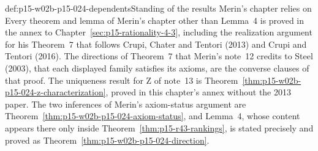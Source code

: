\begin{proofboundary}{def:p15-w02b-p15-024-dependents}{Standing of the results Merin's chapter relies on}
Every theorem and lemma of Merin's chapter other than Lemma~4 is
proved in the annex to Chapter~\ref{sec:p15-rationality-4-3}, including the realization
argument for his Theorem~7 that follows Crupi, Chater and Tentori (2013)
and Crupi and Tentori (2016). The directions of Theorem~7 that Merin's
note~12 credits to Steel (2003), that each displayed family satisfies
its axioms, are the converse clauses of that proof. The uniqueness
result for Z of note~13 is
Theorem~\ref{thm:p15-w02b-p15-024-z-characterization}, proved in this
chapter's annex without the 2013 paper. The two inferences of Merin's
axiom-status argument are
Theorem~\ref{thm:p15-w02b-p15-024-axiom-status}, and Lemma~4, whose
content appears there only inside Theorem~\ref{thm:p15-r43-rankings},
is stated precisely and proved as
Theorem~\ref{thm:p15-w02b-p15-024-direction}.


\end{proofboundary}
